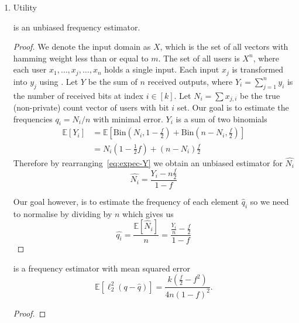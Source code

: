 \documentclass{article}
\begin{document}
\begin{enumerate}
\begin{proof}
\end{proof}
\item Utility
\begin{theorem}
\label{thm:unbiased-estimator}
	 is an unbiased frequency estimator.
\end{theorem}
\begin{proof} We denote the input domain as $X$, which is the set of all vectors with hamming weight less than or equal to $m$. The set of all users is $X^n$, where each user $x_1,\ldots,x_j,\ldots,x_n$ holds a single input. Each input $x_j$ is transformed into $y_j$ using . Let $Y$ be the sum of $n$ received outputs, where $Y_i=\sum_{j=1}^n y_i$ is the number of received bits at index $i\in [k]$. Let $N_i=\sum x_{j,i}$ be the true (non-private) count vector of users with bit $i$ set. Our goal is to estimate the frequencies $q_i=N_i/n$ with minimal error. $Y_i$ is a sum of two binomials
\begin{align}
\mathbb{E}[Y_i] &= \mathbb{E}\left[\text{Bin}\left(N_i,1-\frac{f}{2}\right)+\text{Bin}\left(n-N_i,\frac{f}{2}\right)\right]\label{eq:YsumBin}\\
    &=N_i\left(1-\frac{1}{2}f\right) + (n-N_i)\frac{f}{2}\label{eq:expec-Y}
\end{align}
Therefore by rearranging~\ref{eq:expec-Y} we obtain an unbiased estimator for $\hat{N_i}$
\begin{equation}
    \label{eq:estimator}
    \hat{N_i} = \frac{Y_i-n\frac{f}{2}}{1-f}
\end{equation}

Our goal however, is to estimate the frequency of each element $\hat{q}_i$ so we need to normalise by dividing by $n$ which gives us
\[
\hat{q_i}=\frac{\mathbb{E}[\hat{N}_i]}{n} = \frac{\frac{Y_i}{n}-\frac{f}{2}}{1-f}
\]
\end{proof}
\begin{theorem}
	 is a frequency estimator with mean squared error
	\begin{equation*}
		\mathbb{E}[\ell_2^2(q-\hat{q})] = \frac{k\left(\frac{f}{2}-f^2\right)}{4n(1-f)^2}.
	\end{equation*}
\end{theorem}
\begin{proof}\hfill


\end{proof}
\end{enumerate}
\end{document}
